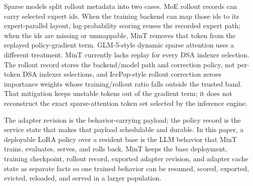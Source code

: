 Sparse models split rollout metadata into two cases. MoE rollout records can carry selected expert ids. When the training backend can map those ids to its expert-parallel layout, log-probability scoring reuses the recorded expert path; when the ids are missing or unmappable, MinT removes that token from the replayed policy-gradient term. GLM-5-style dynamic sparse attention uses a different treatment. MinT currently lacks replay for every DSA indexer selection. The rollout record stores the backend/model path and correction policy, not per-token DSA indexer selections, and IcePop-style rollout correction zeroes importance weights whose training/rollout ratio falls outside the trusted band. That mitigation keeps unstable tokens out of the gradient term; it does not reconstruct the exact sparse-attention token set selected by the inference engine.

The adapter revision is the behavior-carrying payload; the policy record is the service state that makes that payload schedulable and durable. In this paper, a deployable LoRA policy over a resident base is the LLM behavior that MinT trains, evaluates, serves, and rolls back. MinT keeps the base deployment, training checkpoint, rollout record, exported adapter revision, and adapter cache state as separate facts so one trained behavior can be resumed, scored, exported, evicted, reloaded, and served in a larger population.
